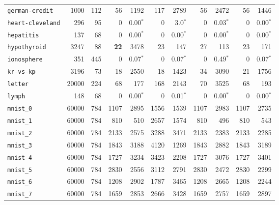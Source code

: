 \begin{tabular}{lccrrrrrrrr}
\texttt{german-credit} & \multicolumn{1}{r}{1000} & \multicolumn{1}{r}{112}  & 56 & 1192 & 117 & 2789 & 56 & 2472 & 56 & 1446\\
\texttt{heart-cleveland} & \multicolumn{1}{r}{296} & \multicolumn{1}{r}{95}  & 0 & 0.00$^*$ & 0 & 3.0$^*$ & 0 & 0.03$^*$ & 0 & 0.00$^*$\\
\texttt{hepatitis} & \multicolumn{1}{r}{137} & \multicolumn{1}{r}{68}  & 0 & 0.00$^*$ & 0 & 0.00$^*$ & 0 & 0.00$^*$ & 0 & 0.00$^*$\\
\texttt{hypothyroid} & \multicolumn{1}{r}{3247} & \multicolumn{1}{r}{88}  & \textbf{22} & 3478 & 23 & 147 & 27 & 113 & 23 & 171\\
\texttt{ionosphere} & \multicolumn{1}{r}{351} & \multicolumn{1}{r}{445}  & 0 & 0.07$^*$ & 0 & 0.07$^*$ & 0 & 0.49$^*$ & 0 & 0.07$^*$\\
\texttt{kr-vs-kp} & \multicolumn{1}{r}{3196} & \multicolumn{1}{r}{73}  & 18 & 2550 & 18 & 1423 & 34 & 3090 & 21 & 1756\\
\texttt{letter} & \multicolumn{1}{r}{20000} & \multicolumn{1}{r}{224}  & 68 & 177 & 168 & 2143 & 70 & 3525 & 68 & 193\\
\texttt{lymph} & \multicolumn{1}{r}{148} & \multicolumn{1}{r}{68}  & 0 & 0.00$^*$ & 0 & 0.01$^*$ & 0 & 0.00$^*$ & 0 & 0.00$^*$\\
\texttt{mnist\_0} & \multicolumn{1}{r}{60000} & \multicolumn{1}{r}{784}  & 1107 & 2895 & 1556 & 1539 & 1107 & 2983 & 1107 & 2735\\
\texttt{mnist\_1} & \multicolumn{1}{r}{60000} & \multicolumn{1}{r}{784}  & 810 & 510 & 2657 & 1574 & 810 & 496 & 810 & 543\\
\texttt{mnist\_2} & \multicolumn{1}{r}{60000} & \multicolumn{1}{r}{784}  & 2133 & 2575 & 3288 & 3471 & 2133 & 2383 & 2133 & 2285\\
\texttt{mnist\_3} & \multicolumn{1}{r}{60000} & \multicolumn{1}{r}{784}  & 1843 & 3188 & 4120 & 1269 & 1843 & 2882 & 1843 & 3189\\
\texttt{mnist\_4} & \multicolumn{1}{r}{60000} & \multicolumn{1}{r}{784}  & 1727 & 3234 & 3423 & 2208 & 1727 & 3076 & 1727 & 3401\\
\texttt{mnist\_5} & \multicolumn{1}{r}{60000} & \multicolumn{1}{r}{784}  & 2830 & 2556 & 3112 & 2791 & 2830 & 2472 & 2830 & 2299\\
\texttt{mnist\_6} & \multicolumn{1}{r}{60000} & \multicolumn{1}{r}{784}  & 1208 & 2902 & 1787 & 3465 & 1208 & 2665 & 1208 & 2244\\
\texttt{mnist\_7} & \multicolumn{1}{r}{60000} & \multicolumn{1}{r}{784}  & 1659 & 2853 & 2666 & 3428 & 1659 & 2757 & 1659 & 2897\\

\end{tabular}
